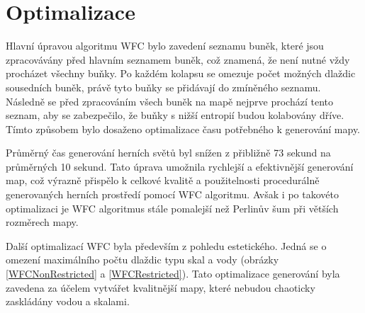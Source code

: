 \section{Optimalizace}
Hlavní úpravou algoritmu WFC bylo zavedení seznamu buněk, které jsou zpracovávány před hlavním seznamem buněk, což znamená, že není nutné vždy procházet všechny buňky. Po každém kolapsu se omezuje počet možných dlaždic sousedních buněk, právě tyto buňky se přidávají do zmíněného seznamu. Následně se před zpracováním všech buněk na mapě nejprve prochází tento seznam, aby se zabezpečilo, že buňky s nižší entropií budou kolabovány dříve. Tímto způsobem bylo dosaženo optimalizace času potřebného k generování mapy.

Průměrný čas generování herních světů byl snížen z přibližně 73 sekund na průměrných 10 sekund. Tato úprava umožnila rychlejší a efektivnější generování map, což výrazně přispělo k celkové kvalitě a použitelnosti procedurálně generovaných herních prostředí pomocí WFC algoritmu. Avšak i po takovéto optimalizaci je WFC algoritmus stále pomalejší než Perlinův šum při větších rozměrech mapy.

Další optimalizací WFC byla především z pohledu estetického. Jedná se o omezení maximálního počtu dlaždic typu skal a vody (obrázky \ref{WFCNonRestricted} a \ref{WFCRestricted}). Tato optimalizace generování byla zavedena za účelem vytvářet kvalitnější mapy, které nebudou chaoticky zaskládány vodou a skalami. 

